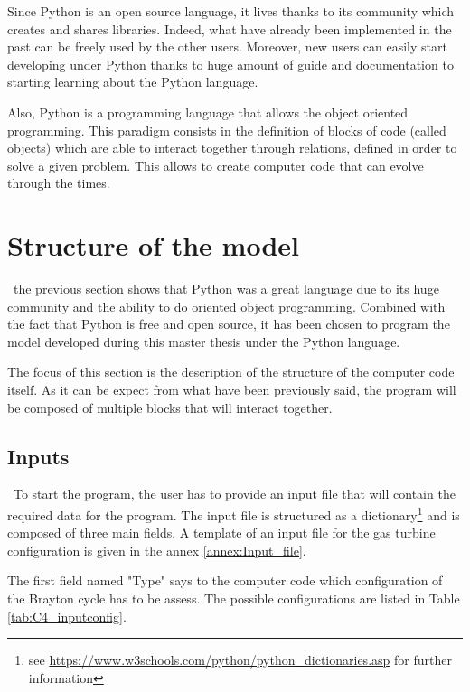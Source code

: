 Since Python is an open source language, it lives thanks to its community which creates and shares libraries. Indeed, what have already been implemented in the past can be freely used by the other users. Moreover, new users can easily start developing under Python thanks to huge amount of guide and documentation to starting learning about the Python language.

Also, Python is a programming language that allows the object oriented programming. This paradigm consists in the definition of blocks of code (called objects) which are able to interact together through relations, defined in order to solve a given problem. This allows to create computer code that can evolve through the times. 

\section{Structure of the model}
\quad\, the previous section shows that Python was a great language due to its huge community and the ability to do oriented object programming. Combined with the fact that Python is free and open source, it has been chosen to program the model developed during this master thesis under the Python language.

The focus of this section is the description of the structure of the computer code itself. As it can be expect from what have been previously said, the program will be composed of multiple blocks that will interact together.

\subsection{Inputs}
\quad\, To start the program, the user has to provide an input file that will contain the required data for the program. The input file is structured as a dictionary\footnote{see \url{https://www.w3schools.com/python/python_dictionaries.asp} for further information} and is composed of three main fields. A template of an input file for the gas turbine configuration is given in the annex \ref{annex:Input_file}.

The first field named "Type" says to the computer code which configuration of the Brayton cycle has to be assess. The possible configurations are listed in Table \ref{tab:C4_inputconfig}.

